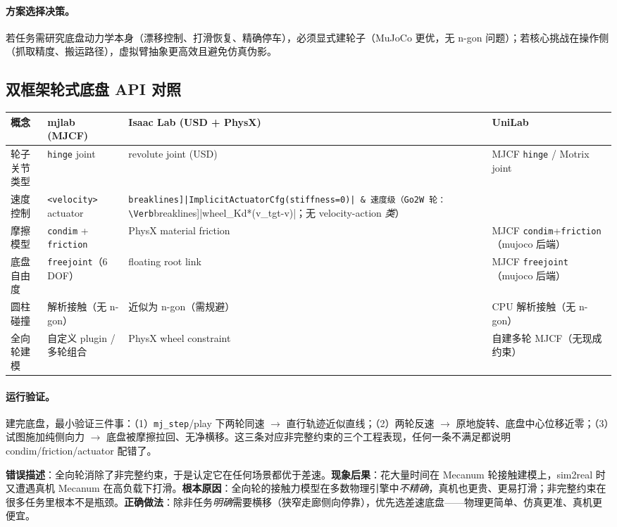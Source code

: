 \paragraph{方案选择决策。}若任务需研究底盘动力学本身（漂移控制、打滑恢复、精确停车），必须显式建轮子（MuJoCo 更优，无 n-gon 问题）；若核心挑战在操作侧（抓取精度、搬运路径），虚拟臂抽象更高效且避免仿真伪影。

\subsection{双框架轮式底盘 API 对照}
\label{sec:rlmc-wh-base-api}

\begin{center}
\small
\begin{tabularx}{\linewidth}{@{}lLLL@{}}
\toprule
概念 & mjlab (MJCF) & Isaac Lab (USD + PhysX) & UniLab \\
\midrule
轮子关节类型 & \verb|hinge| joint & revolute joint (USD) & MJCF \verb|hinge| / Motrix joint \\
速度控制 & \verb|<velocity>| actuator & \Verb[breaklines]|ImplicitActuatorCfg(stiffness=0)| & 速度级（Go2W 轮：\Verb[breaklines]|wheel_Kd*(v_tgt-v)|；无 velocity-action \emph{类}） \\
摩擦模型 & \verb|condim| + \verb|friction| & PhysX material friction & MJCF \verb|condim|+\verb|friction|（mujoco 后端） \\
底盘自由度 & \verb|freejoint|（6 DOF） & floating root link & MJCF \verb|freejoint|（mujoco 后端） \\
圆柱碰撞 & 解析接触（无 n-gon） & 近似为 n-gon（需规避） & CPU 解析接触（无 n-gon） \\
全向轮建模 & 自定义 plugin / 多轮组合 & PhysX wheel constraint & 自建多轮 MJCF（无现成约束） \\
\bottomrule
\end{tabularx}
\end{center}

\paragraph{运行验证。}建完底盘，最小验证三件事：（1）\verb|mj_step|/play 下两轮同速 $\to$ 直行轨迹近似直线；（2）两轮反速 $\to$ 原地旋转、底盘中心位移近零；（3）试图施加纯侧向力 $\to$ 底盘被摩擦拉回、无净横移。这三条对应非完整约束的三个工程表现，任何一条不满足都说明 condim/friction/actuator 配错了。

\begin{pitfall}
\textbf{错误描述}：全向轮消除了非完整约束，于是认定它在任何场景都优于差速。\textbf{现象后果}：花大量时间在 Mecanum 轮接触建模上，sim2real 时又遭遇真机 Mecanum 在高负载下打滑。\textbf{根本原因}：全向轮的接触力模型在多数物理引擎中\emph{不精确}，真机也更贵、更易打滑；非完整约束在很多任务里根本不是瓶颈。\textbf{正确做法}：除非任务\emph{明确}需要横移（狭窄走廊侧向停靠），优先选差速底盘——物理更简单、仿真更准、真机更便宜。
\end{pitfall}

